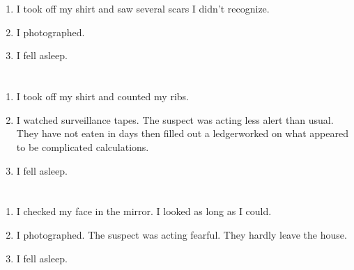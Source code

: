 \documentclass{article}
\begin{document}
    \newpage
    
    \section{}
    
    \begin{enumerate}
    
    \item I took off my shirt and saw several scars I didn't recognize.\\
    
    \item I photographed.\\
    
    \item I fell asleep.\\
    
    \end{enumerate}
     
    \newpage
    
    \section{}
    
    \begin{enumerate}
    
    \item I took off my shirt and counted my ribs.\\
    
    \item I watched surveillance tapes. The suspect was acting less alert than usual. They have not eaten in days then filled out a ledgerworked on what appeared to be complicated calculations.\\
    
    \item I fell asleep.\\
    
    \end{enumerate}
     
    \newpage
    
    \section{}
    
    \begin{enumerate}
    
    \item I checked my face in the mirror. I looked as long as I could.\\
    
    \item I photographed. The suspect was acting fearful. They hardly leave the house.\\
    
    \item I fell asleep.\\
    
    \end{enumerate}
     
\end{document}
